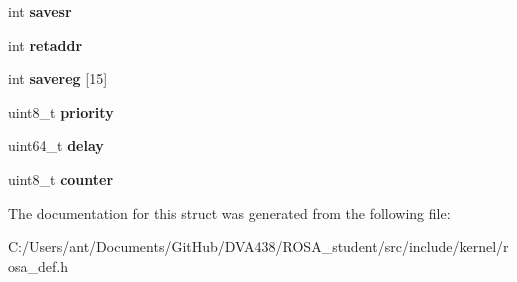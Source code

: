 \begin{DoxyCompactItemize}
int {\bfseries savesr}
\item 
\mbox{\label{structtcb__record__t_a1cd699134048594684fdc0c1a5ed1ed3}} 
int {\bfseries retaddr}
\item 
\mbox{\label{structtcb__record__t_ab62fb376bbf1ce34b1d962f24e46b825}} 
int {\bfseries savereg} \mbox{[}15\mbox{]}
\item 
\mbox{\label{structtcb__record__t_a0ad043071ccc7a261d79a759dc9c6f0c}} 
uint8\+\_\+t {\bfseries priority}
\item 
\mbox{\label{structtcb__record__t_a8c0b95ab06c950bd9afd8444922d98a3}} 
uint64\+\_\+t {\bfseries delay}
\item 
\mbox{\label{structtcb__record__t_a0480b812cba9c1d9c71a5fb1071bd0fc}} 
uint8\+\_\+t {\bfseries counter}
\end{DoxyCompactItemize}


The documentation for this struct was generated from the following file\+:\begin{DoxyCompactItemize}
\item 
C\+:/\+Users/ant/\+Documents/\+Git\+Hub/\+D\+V\+A438/\+R\+O\+S\+A\+\_\+student/src/include/kernel/rosa\+\_\+def.\+h\end{DoxyCompactItemize}
